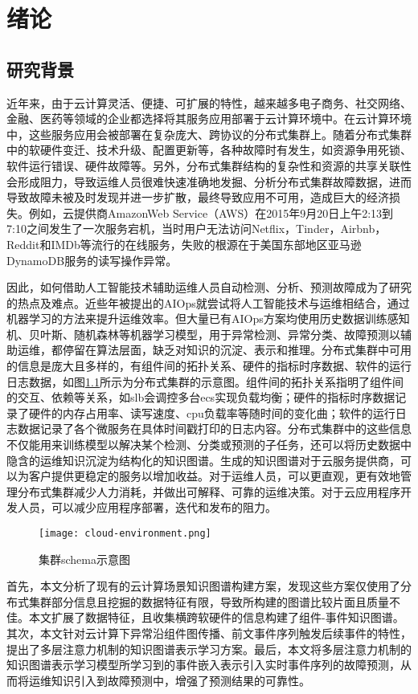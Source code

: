 \chapter{绪论}
\section{研究背景}
近年来，由于云计算灵活、便捷、可扩展的特性，越来越多电子商务、社交网络、金融、医药等领域的企业都选择将其服务应用部署于云计算环境中。在云计算环境中，这些服务应用会被部署在复杂庞大、跨协议的分布式集群上。随着分布式集群中的软硬件变迁、技术升级、配置更新等，各种故障时有发生，如资源争用死锁、软件运行错误、硬件故障等。另外，分布式集群结构的复杂性和资源的共享关联性会形成阻力，导致运维人员很难快速准确地发掘、分析分布式集群故障数据，进而导致故障未被及时发现并进一步扩散，最终导致应用不可用，造成巨大的经济损失。例如，云提供商AmazonWeb Service（AWS）在2015年9月20日上午2:13到7:10之间发生了一次服务宕机，当时用户无法访问Netflix，Tinder，Airbnb，Reddit和IMDb等流行的在线服务，失败的根源在于美国东部地区亚马逊DynamoDB服务的读写操作异常。

因此，如何借助人工智能技术辅助运维人员自动检测、分析、预测故障成为了研究的热点及难点。近些年被提出的AIOps就尝试将人工智能技术与运维相结合，通过机器学习的方法来提升运维效率。但大量已有AIOps方案均使用历史数据训练感知机、贝叶斯、随机森林等机器学习模型，用于异常检测、异常分类、故障预测以辅助运维，都停留在算法层面，缺乏对知识的沉淀、表示和推理。分布式集群中可用的信息是庞大且多样的，有组件间的拓扑关系、硬件的指标时序数据、软件的运行日志数据，如图\ref{cloud-environment}所示为分布式集群的示意图。组件间的拓扑关系指明了组件间的交互、依赖等关系，如slb会调控多台ecs实现负载均衡；硬件的指标时序数据记录了硬件的内存占用率、读写速度、cpu负载率等随时间的变化曲；软件的运行日志数据记录了各个微服务在具体时间戳打印的日志内容。分布式集群中的这些信息不仅能用来训练模型以解决某个检测、分类或预测的子任务，还可以将历史数据中隐含的运维知识沉淀为结构化的知识图谱。生成的知识图谱对于云服务提供商，可以为客户提供更稳定的服务以增加收益。对于运维人员，可以更直观，更有效地管理分布式集群减少人力消耗，并做出可解释、可靠的运维决策。对于云应用程序开发人员，可以减少应用程序部署，迭代和发布的阻力。
\begin{figure}[htbp]
    \centering
    \texttt{[image: cloud-environment.png]}
    \caption{集群schema示意图\label{cloud-environment}}
\end{figure}

首先，本文分析了现有的云计算场景知识图谱构建方案，发现这些方案仅使用了分布式集群部分信息且挖掘的数据特征有限，导致所构建的图谱比较片面且质量不佳。本文扩展了数据特征，且收集横跨软硬件的信息构建了组件-事件知识图谱。其次，本文针对云计算下异常沿组件图传播、前文事件序列触发后续事件的特性，提出了多层注意力机制的知识图谱表示学习方案。最后，本文将多层注意力机制的知识图谱表示学习模型所学习到的事件嵌入表示引入实时事件序列的故障预测，从而将运维知识引入到故障预测中，增强了预测结果的可靠性。

